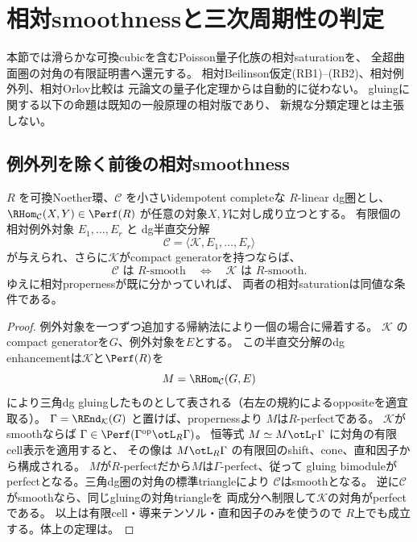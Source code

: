 \section{相対smoothnessと三次周期性の判定}
\label{sec:relative-saturation-reduction}
本節では滑らかな可換cubicを含むPoisson量子化族の相対saturationを、
全超曲面圏の対角の有限証明書へ還元する。
相対Beilinson仮定(RB1)--(RB2)、相対例外列、相対Orlov比較は
元論文の量子化定理からは自動的に従わない。
gluingに関する以下の命題は既知の一般原理の相対版であり、
新規な分類定理とは主張しない\cite[Theorem 3.25]{OrlovGlue}。

\subsection{例外列を除く前後の相対smoothness}
\begin{proposition}[相対smoothnessの同値]
\label{prop:saturation-reduction}
$R$ を可換Noether環、$\mathcal C$ を小さいidempotent completeな
$R$-linear dg圏とし、
$\RHom_{\mathcal C}(X,Y)\in\Perf(R)$ が任意の対象$X,Y$に対し成り立つとする。
有限個の相対例外対象 $E_1,\ldots,E_r$ と
dg半直交分解
\[
\mathcal C=\langle\mathcal K,E_1,\ldots,E_r\rangle
\]
が与えられ、さらに$\mathcal K$がcompact generatorを持つならば、
\[
\mathcal C\text{ は }R\text{-smooth}
\quad\Longleftrightarrow\quad
\mathcal K\text{ は }R\text{-smooth}.
\]
ゆえに相対propernessが既に分かっていれば、
両者の相対saturationは同値な条件である。
\end{proposition}
\begin{proof}
例外対象を一つずつ追加する帰納法により一個の場合に帰着する。
$\mathcal K$ のcompact generatorを$G$、例外対象を$E$とする。
この半直交分解のdg enhancementは$\mathcal K$と$\Perf(R)$を
\[
M=\RHom_{\mathcal C}(G,E)
\]
により三角dg gluingしたものとして表される（右左の規約によるoppositeを適宜取る）。
$\Gamma=\REnd_{\mathcal K}(G)$ と置けば、propernessより
$M$は$R$-perfectである。
$\mathcal K$がsmoothならば
$\Gamma\in\Perf(\Gamma^{\mathrm{op}}\otL_R\Gamma)$。
恒等式 $M\simeq M\otL_\Gamma\Gamma$ に対角の有限cell表示を適用すると、
その像は $M\otL_R\Gamma$ の有限回のshift、cone、直和因子から構成される。
$M$が$R$-perfectだから$M$は$\Gamma$-perfect、従って
gluing bimoduleがperfectとなる。三角dg圏の対角の標準triangleにより
$\mathcal C$はsmoothとなる。
逆に$\mathcal C$がsmoothなら、同じgluingの対角triangleを
両成分へ制限して$\mathcal K$の対角がperfectである。
以上は有限cell・導来テンソル・直和因子のみを使うので
$R$上でも成立する。体上の定理は\cite[Theorem 3.25]{OrlovGlue}。
\end{proof}

